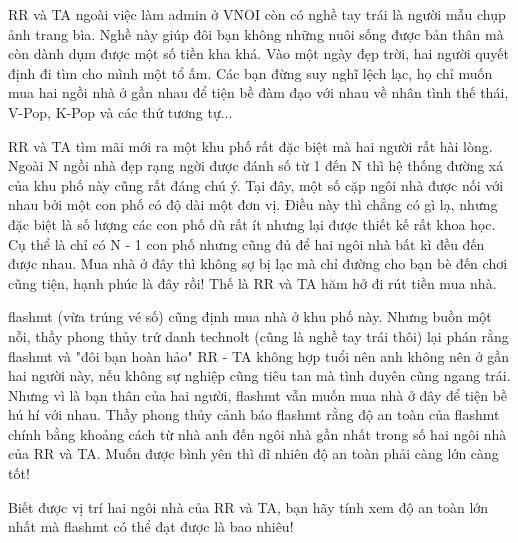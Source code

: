 RR và TA ngoài việc làm admin ở VNOI còn có nghề tay trái là người mẫu chụp ảnh trang bìa. Nghề này giúp đôi bạn không những nuôi sống được bản thân mà còn dành dụm được một số tiền kha khá. Vào một ngày đẹp trời, hai người quyết định đi tìm cho mình một tổ ấm. Các bạn đừng suy nghĩ lệch lạc, họ chỉ muốn mua hai ngồi nhà ở gần nhau để tiện bề đàm đạo với nhau về nhân tình thế thái, V-Pop, K-Pop và các thứ tương tự...  

   RR và TA tìm mãi mới ra một khu phố rất đặc biệt mà hai người rất hài lòng. Ngoài N ngồi nhà đẹp rạng ngời được đánh số từ 1 đến N thì hệ thống đường xá của khu phố này cũng rất đáng chú ý. Tại đây, một số cặp ngôi nhà được nối với nhau bởi một con phố có độ dài một đơn vị. Điều này thì chẳng có gì lạ, nhưng đặc biệt là số lượng các con phố dù rất ít nhưng lại được thiết kế rất khoa học. Cụ thể là chỉ có N - 1 con phố nhưng cũng đủ để hai ngôi nhà bất kì đều đến được nhau. Mua nhà ở đây thì không sợ bị lạc mà chỉ đường cho bạn bè đến chơi cũng tiện, hạnh phúc là đây rồi! Thế là RR và TA hăm hở đi rút tiền mua nhà.  

   flashmt (vừa trúng vé số) cũng định mua nhà ở khu phố này. Nhưng buồn một nỗi, thầy phong thủy trứ danh technolt (cũng là nghề tay trái thôi) lại phán rằng flashmt và "đôi bạn hoàn hảo" RR - TA không hợp tuổi nên anh không nên ở gần hai người này, nếu không sự nghiệp cũng tiêu tan mà tình duyên cũng ngang trái. Nhưng vì là bạn thân của hai người, flashmt vẫn muốn mua nhà ở đây để tiện bề hú hí với nhau. Thầy phong thủy cảnh báo flashmt rằng độ an toàn của flashmt chính bằng khoảng cách từ nhà anh đến ngôi nhà gần nhất trong số hai ngôi nhà của RR và TA. Muốn được bình yên thì dĩ nhiên độ an toàn phải càng lớn càng tốt!  

   Biết được vị trí hai ngôi nhà của RR và TA, bạn hãy tính xem độ an toàn lớn nhất mà flashmt có thể đạt được là bao nhiêu!